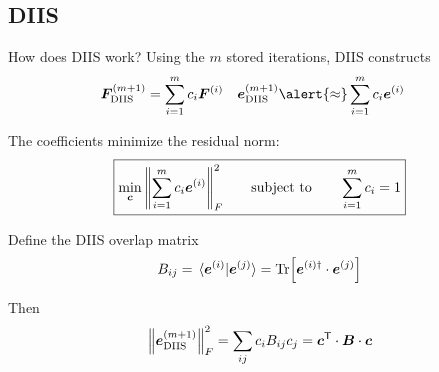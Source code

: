 \documentclass[aspectratio=169,9pt]{beamer}
\newcommand{\bc}{\boldsymbol{c}}
\newcommand{\bB}{\boldsymbol{B}}
\newcommand{\bF}{\boldsymbol{F}}
\newcommand{\be}{\boldsymbol{e}}
\begin{document}
\subsection{DIIS}
\begin{frame}{How does DIIS work?}
	Using the $m$ stored iterations, DIIS constructs
	\begin{align*}
		\bF_\text{DIIS}^{(m+1)}
		&=
		\sum_{i=1}^{m}c_i\bF^{(i)}
		&
		\be_\text{DIIS}^{(m+1)}
		&\alert{\approx}
		\sum_{i=1}^{m}c_i\be^{(i)}
	\end{align*}

	The coefficients minimize the residual norm:
	\begin{equation*}
		\boxed{
			\min_{\bc}
			\norm{
				\sum_{i=1}^{m}c_i\be^{(i)}
			}_F^2
			\qquad
			\text{subject to}
			\qquad
			\sum_{i=1}^{m}c_i=1
		}
	\end{equation*}

	Define the DIIS overlap matrix
	\begin{equation*}
		B_{ij}
		=
		\braket*{\be^{(i)}}{\be^{(j)}}
		=
		\Tr[
			\be^{(i)\dagger} \cdot \be^{(j)}
		]
	\end{equation*}

	Then
	\begin{equation*}
		\norm{\be_\text{DIIS}^{(m+1)}}_F^2
		=
		\sum_{ij}c_iB_{ij}c_j
		=
		\bc^\mathsf{T} \cdot \bB \cdot \bc
	\end{equation*}
\end{frame}

\end{document}
